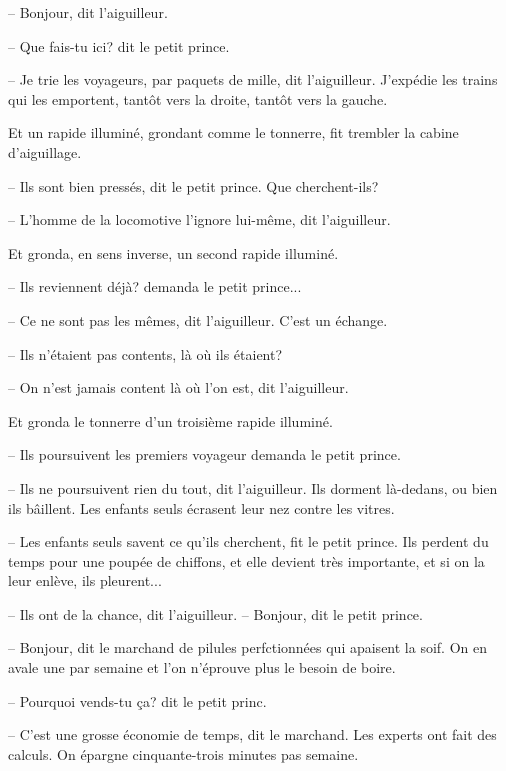 \documentclass[a4paper]{report}
\begin{document}
-- Bonjour, dit l'aiguilleur.

-- Que fais-tu ici? dit le petit prince.

-- Je trie les voyageurs, par paquets de mille, dit l'aiguilleur. J'expédie les trains qui les emportent, tantôt vers la droite, tantôt vers la gauche.

Et un rapide illuminé, grondant comme le tonnerre, fit trembler la cabine d'aiguillage.

-- Ils sont bien pressés, dit le petit prince. Que cherchent-ils?

-- L'homme de la locomotive l'ignore lui-même, dit l'aiguilleur.

Et gronda, en sens inverse, un second rapide illuminé.

-- Ils reviennent déjà? demanda le petit prince...

-- Ce ne sont pas les mêmes, dit l'aiguilleur. C'est un échange.

-- Ils n'étaient pas contents, là où ils étaient?

-- On n'est jamais content là où l'on est, dit l'aiguilleur.

Et gronda le tonnerre d'un troisième rapide illuminé.

-- Ils poursuivent les premiers voyageur demanda le petit prince.

-- Ils ne poursuivent rien du tout, dit l'aiguilleur. Ils dorment là-dedans, ou bien ils bâillent. Les enfants seuls écrasent leur nez contre les vitres.

-- Les enfants seuls savent ce qu'ils cherchent, fit le petit prince. Ils perdent du temps pour une poupée de chiffons, et elle devient très importante, et si on la leur enlève, ils pleurent...

-- Ils ont de la chance, dit l'aiguilleur.
\parachapter{} %
-- Bonjour, dit le petit prince.

-- Bonjour, dit le marchand de pilules perfctionnées qui apaisent la soif. On en avale une par semaine et l'on n'éprouve plus le besoin de boire.

-- Pourquoi vends-tu ça? dit le petit princ.

-- C'est une grosse économie de temps, dit le marchand. Les experts ont fait des calculs. On épargne cinquante-trois minutes pas semaine.
\end{document}
